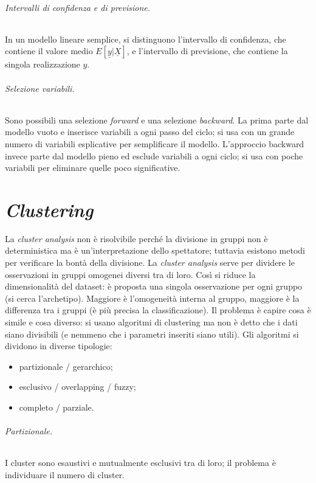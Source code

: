 \documentclass[11pt, a4page, twocolumn]{article}
\begin{document}
\paragraph{Intervalli di confidenza e di previsione.}
In un modello lineare semplice, si distinguono l'intervallo di confidenza, che contiene il valore medio $E[\underline{y} | \underline{X}]$, e l'intervallo di previsione, che contiene la singola realizzazione $y$.

\paragraph{Selezione variabili.}
Sono possibili una selezione \textit{forward} e una selezione \textit{backward}.
La prima parte dal modello vuoto e inserisce variabili a ogni passo del ciclo; si usa con un grande numero di variabili esplicative per semplificare il modello.
L'approccio backward invece parte dal modello pieno ed esclude variabili a ogni ciclo; si usa con poche variabili per eliminare quelle poco significative.



\newpage
\part{\textit{Clustering}}
La \textit{cluster analysis} non è risolvibile perché la divisione in gruppi non è deterministica ma è un'interpretazione dello spettatore; tuttavia esistono metodi per verificare la bontà della divisione.
La \textit{cluster analysis} serve per dividere le osservazioni in gruppi omogenei diversi tra di loro.
Così si riduce la dimensionalità del dataset: è proposta una singola osservazione per ogni gruppo (si cerca l'archetipo).
Maggiore è l'omogeneità interna al gruppo, maggiore è la differenza tra i gruppi (è più precisa la classificazione). \newline
Il problema è capire cosa è simile e cosa diverso: si usano algoritmi di clustering ma non è detto che i dati siano divisibili (e nemmeno che i parametri inseriti siano utili).
Gli algoritmi si dividono in diverse tipologie:
\begin{itemize}
\item partizionale / gerarchico;
\item esclusivo / overlapping / fuzzy;
\item completo / parziale.
\end{itemize}
\paragraph{Partizionale.}
I cluster sono esaustivi e mutualmente esclusivi tra di loro; il problema è individuare il numero di cluster.
\end{document}
